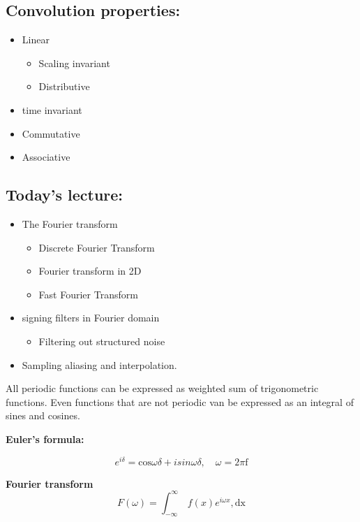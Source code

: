 \subsection*{Convolution properties:}

\begin{itemize}
	\item Linear
	\begin{itemize}
		\item Scaling invariant 
		\item Distributive 
	\end{itemize}
	\item time invariant
	\item Commutative 
	\item Associative
\end{itemize}

\subsection*{Today's lecture:}

\begin{itemize}
	\item The Fourier transform
	\begin{itemize}
		\item Discrete Fourier Transform 
		\item Fourier transform in 2D
		\item Fast Fourier Transform
	\end{itemize}
	\item signing filters in Fourier domain
	\begin{itemize}
		\item Filtering out structured noise
	\end{itemize}
	\item Sampling aliasing and interpolation. 
\end{itemize}

All periodic functions can be expressed as weighted sum of trigonometric functions. Even functions that are not periodic van be expressed as an integral of sines and cosines. 

\textbf{Euler's formula:}

\begin{equation}
e^{i\delta} = \text{cos}\omega\delta + i sin \omega\delta, \quad \omega = 2\pi \text{f}
\end{equation}

\textbf{Fourier transform }
\begin{equation}
F(\omega) = \int_{-\infty}^{\infty} \ f(x) e^{i\omega x},\text{dx}
\end{equation}

